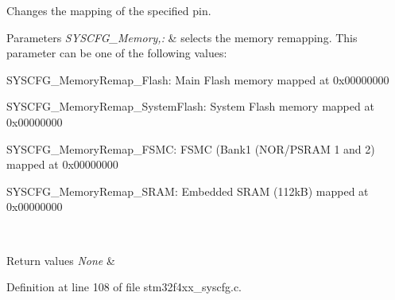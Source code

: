 Changes the mapping of the specified pin. 


\begin{DoxyParams}{Parameters}
{\em S\-Y\-S\-C\-F\-G\-\_\-\-Memory,\-:} & selects the memory remapping. This parameter can be one of the following values\-: \begin{DoxyItemize}
\item S\-Y\-S\-C\-F\-G\-\_\-\-Memory\-Remap\-\_\-\-Flash\-: Main Flash memory mapped at 0x00000000 \item S\-Y\-S\-C\-F\-G\-\_\-\-Memory\-Remap\-\_\-\-System\-Flash\-: System Flash memory mapped at 0x00000000 \item S\-Y\-S\-C\-F\-G\-\_\-\-Memory\-Remap\-\_\-\-F\-S\-M\-C\-: F\-S\-M\-C (Bank1 (N\-O\-R/\-P\-S\-R\-A\-M 1 and 2) mapped at 0x00000000 \item S\-Y\-S\-C\-F\-G\-\_\-\-Memory\-Remap\-\_\-\-S\-R\-A\-M\-: Embedded S\-R\-A\-M (112k\-B) mapped at 0x00000000 \end{DoxyItemize}
\\
\hline
\end{DoxyParams}

\begin{DoxyRetVals}{Return values}
{\em None} & \\
\hline
\end{DoxyRetVals}


Definition at line 108 of file stm32f4xx\-\_\-syscfg.\-c.


